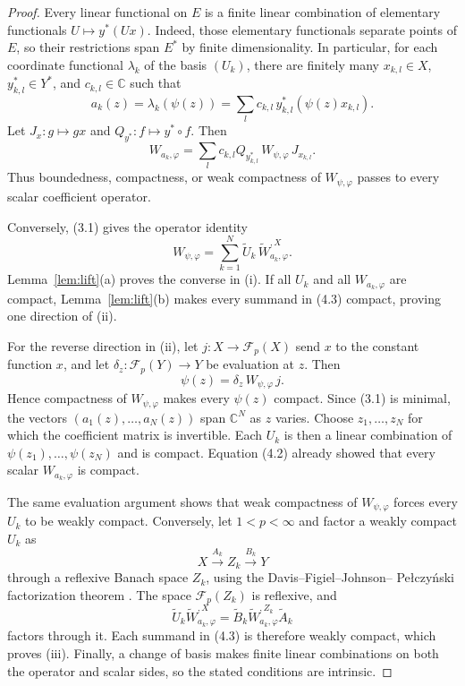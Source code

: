 \documentclass[11pt]{article}
\theoremstyle{remark}
\newcommand{\F}{\mathcal F}
\newcommand{\wc}{W_{\psi,\varphi}}
\newcommand{\wa}[1]{W_{#1,\varphi}}
\begin{document}
\begin{proof}
Every linear functional on $E$ is a finite linear combination of elementary
functionals $U\mapsto y^*(Ux)$.  Indeed, those elementary functionals
separate points of $E$, so their restrictions span $E^*$ by finite
dimensionality.  In particular, for each coordinate functional $\lambda_k$
of the basis $(U_k)$, there are finitely many $x_{k,l}\in X$,
$y_{k,l}^*\in Y^*$, and $c_{k,l}\in\mathbb C$ such that
\[
 a_k(z)=\lambda_k(\psi(z))
 =\sum_l c_{k,l}\,y_{k,l}^*(\psi(z)x_{k,l}).
 \tag{4.1}
\]
Let $J_x:g\mapsto gx$ and $Q_{y^*}:f\mapsto y^*\circ f$.  Then
\[
 \wa{a_k}=\sum_l c_{k,l}Q_{y_{k,l}^*}\,\wc\,J_{x_{k,l}}.
 \tag{4.2}
\]
Thus boundedness, compactness, or weak compactness of $\wc$ passes to every
scalar coefficient operator.

Conversely, (3.1) gives the operator identity
\[
 \wc=\sum_{k=1}^N
 \widetilde U_k\,\widetilde W_{a_k,\varphi}^{,X}.
 \tag{4.3}
\]
Lemma~\ref{lem:lift}(a) proves the converse in (i).  If all $U_k$ and all
$\wa{a_k}$ are compact, Lemma~\ref{lem:lift}(b) makes every summand in (4.3)
compact, proving one direction of (ii).

For the reverse direction in (ii), let $j:X\to\F_p(X)$ send $x$ to the
constant function $x$, and let $\delta_z:\F_p(Y)\to Y$ be evaluation at $z$.
Then
\[
 \psi(z)=\delta_z\,\wc\,j.
 \tag{4.4}
\]
Hence compactness of $\wc$ makes every $\psi(z)$ compact.  Since (3.1) is
minimal, the vectors $(a_1(z),\ldots,a_N(z))$ span $\mathbb C^N$ as $z$
varies.  Choose $z_1,\ldots,z_N$ for which the coefficient matrix is
invertible.  Each $U_k$ is then a linear combination of
$\psi(z_1),\ldots,\psi(z_N)$ and is compact.  Equation (4.2) already showed
that every scalar $\wa{a_k}$ is compact.

The same evaluation argument shows that weak compactness of $\wc$ forces
every $U_k$ to be weakly compact.  Conversely, let $1<p<\infty$ and factor a
weakly compact $U_k$ as
\[
 X\xrightarrow{A_k} Z_k\xrightarrow{B_k}Y
 \tag{4.5}
\]
through a reflexive Banach space $Z_k$, using the Davis--Figiel--Johnson--
Pe\l czy\'nski factorization theorem \cite{DFJP}.  The space
$\F_p(Z_k)$ is reflexive, and
\[
 \widetilde U_k\widetilde W_{a_k,\varphi}^{,X}
 =\widetilde B_k\widetilde W_{a_k,\varphi}^{,Z_k}\widetilde A_k
 \tag{4.6}
\]
factors through it.  Each summand in (4.3) is therefore weakly compact, which
proves (iii).  Finally, a change of basis makes finite linear combinations on
both the operator and scalar sides, so the stated conditions are intrinsic.
\end{proof}
\end{document}
